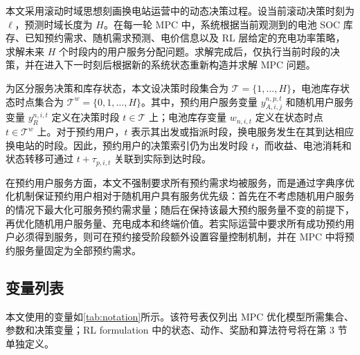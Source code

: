 \documentclass[12pt,hyperref,a4paper,UTF8]{ctexart}
\begin{document}
本文采用滚动时域思想刻画换电站运营中的动态决策过程。设当前滚动决策时刻为 $\ell$，预测时域长度为 $H$。在每一轮 MPC 中，系统根据当前观测到的电池 SOC 库存、已知预约需求、随机需求预测、电价信息以及 RL 层给定的充电功率策略，求解未来 $H$ 个时段内的用户服务分配问题。求解完成后，仅执行当前时段的决策，并在进入下一时刻后根据新的系统状态重新构造并求解 MPC 问题。

为区分服务决策和库存状态，本文设决策时段集合为 $\mathcal{T}=\{1,\ldots,H\}$，电池库存状态时点集合为 $\mathcal{T}^{w}=\{0,1,\ldots,H\}$。其中，预约用户服务变量 $y_{A,i,j}^{n,p,t}$ 和随机用户服务变量 $y_R^{n,i,t}$ 定义在决策时段 $t\in\mathcal{T}$ 上；电池库存变量 $w_{n,i,t}$ 定义在状态时点 $t\in\mathcal{T}^{w}$ 上。对于预约用户，$t$ 表示其出发或指派时段，换电服务发生在其到达相应换电站的时段。因此，预约用户的决策索引仍为出发时段 $t$，而收益、电池消耗和状态转移可通过 $t+\tau_{p,i,t}$ 关联到实际到达时段。

在预约用户服务方面，本文不强制要求所有预约需求均被服务，而是通过字典序优化机制保证预约用户相对于随机用户具有服务优先级：首先在不考虑随机用户服务的情况下最大化可服务预约需求量；随后在保持该最大预约服务量不变的前提下，再优化随机用户服务量、充电成本和终端价值。若实际运营中要求所有成功预约用户必须得到服务，则可在预约接受阶段额外设置容量控制机制，并在 MPC 中将预约服务量固定为全部预约需求。

\subsection{变量列表}

本文使用的变量如\autoref{tab:notation}所示。该符号表仅列出 MPC 优化模型所需集合、参数和决策变量；RL formulation 中的状态、动作、奖励和算法符号将在第 3 节单独定义。
\end{document}
